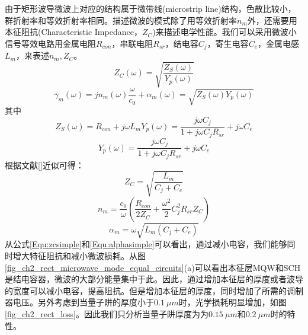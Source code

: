 由于矩形波导微波上对应的结构属于微带线(microstrip  line)结构，色散比较小，群折射率和等效折射率相同。描述微波的模式除了用等效折射率$n_m$外，还需要用本征阻抗(Characteristic Impedance，$Z_C$)来描述电学性能。我们可以采用微波小信号等效电路用金属电阻$R_{con}$，串联电阻$R_{sr}$，结电容$C_j$，寄生电容$C_e$，金属电感$L_m$，来表述$n_m, Z_C$。
\begin{equation}
\label{Equ:zc}
Z_C(\omega) = \sqrt{\frac{Z_S(\omega)}{Y_p(\omega)}}
\end{equation}
\begin{equation}
\label{Equ:gammam}
\gamma_m(\omega) = jn_m(\omega)\frac{\omega}{c_0} + \alpha_m(\omega) = \sqrt{Z_S(\omega)Y_p(\omega)}
\end{equation}
其中
\begin{equation}
\label{Equ:zs}
Z_S(\omega) = R_{con}+j\omega L_m
Y_p(\omega) = \frac{j\omega C_j}{1+j\omega C_jR_{sr}}+j\omega C_e
\end{equation}
\begin{equation}
\label{Equ:yp}
Y_p(\omega) = \frac{j\omega C_j}{1+j\omega C_jR_{sr}}+j\omega C_e
\end{equation}
根据文献[]近似可得：
\begin{equation}
\label{Equ:zcsimple}
Z_C = \sqrt{\frac{L_m}{C_j+C_e}}
\end{equation}
\begin{equation}
\label{Equ:nmsimple}
n_m = \frac{c_0}{\omega}\left(\frac{R_{con}}{2Z_C} + \frac{\omega^2}{2}C^2_jR_{sr}Z_C\right)
\end{equation}
\begin{equation}
\label{Equ:alphasimple}
\alpha_m = \omega\sqrt{L_m(C_j+C_e)}
\end{equation}
从公式\ref{Equ:zcsimple}和\ref{Equ:alphasimple}可以看出，通过减小电容，我们能够同时增大特征阻抗和减小微波损耗。从图\ref{fig_ch2_rect_microwave_mode_equal_circuits}(a)可以看出本征层MQW和SCH是结电容器，微波的大部分能量集中于此。因此，通过增加本征层的厚度或者波导的宽度可以减小电容，提高阻抗。但是增加本征层的厚度，同时增加了所需的调制器电压。另外考虑到当量子阱的厚度小于$0.1 ~\mu m$时，光学损耗明显增加，如图\ref{fig_ch2_rect_loss}。因此我们只分析当量子阱厚度为为$0.15~ \mu m$和$0.2 ~\mu m$时的特性。
